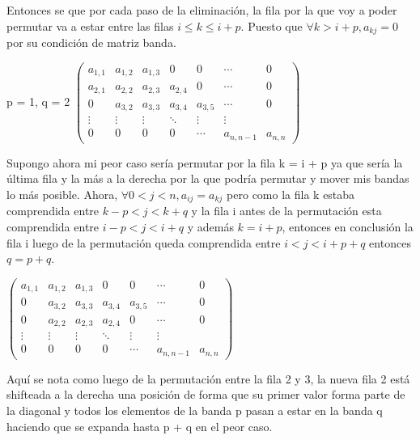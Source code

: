 Entonces se que por cada paso de la eliminaci\'on, la fila por la que voy a poder permutar va a estar entre las filas $i \leq k \leq i + p$. 
Puesto que $\forall k > i + p, a_{kj} = 0$ por su condici\'on de matriz banda.\newline
\newline
\begin{center}
p = 1, q = 2
$\begin{pmatrix}
a_{1,1} & a_{1,2} & a_{1,3} & 0 & 0 & \cdots & 0 \\
a_{2,1} & a_{2,2} & a_{2,3} & a_{2,4}& 0 & \cdots & 0 \\
0 & a_{3,2} & a_{3,3} & a_{3,4} & a_{3,5}& \cdots & 0 \\
\vdots  & \vdots & \vdots  & \ddots & \vdots & \vdots \\
0 & 0 & 0 & 0 & \cdots & a_{n, n-1} & a_{n,n}
\end{pmatrix}$ 
\end{center}
\newpage
Supongo ahora mi peor caso ser\'ia permutar por la fila k = i + p ya que ser\'ia la \'ultima fila y la m\'as a la derecha por la que podr\'ia permutar 
y mover mis bandas lo m\'as posible. Ahora, $\forall 0 < j < n, a_{ij} = a_{kj}$ pero como la fila k estaba comprendida entre $k-p < j < k + q$ y la 
fila i antes de la permutaci\'on esta comprendida entre $i-p < j < i + q$ y adem\'as $k = i + p$, entonces en conclusi\'on la fila i luego de la 
permutaci\'on queda comprendida entre $i < j < i + p + q$ entonces $q = p+q$.
\newline
\begin{center}
$\begin{pmatrix}
a_{1,1} & a_{1,2} & a_{1,3} & 0 & 0 & \cdots & 0 \\
0 & a_{3,2} & a_{3,3} & a_{3,4} & a_{3,5}& \cdots & 0 \\
0 & a_{2,2} & a_{2,3} & a_{2,4}& 0 & \cdots & 0 \\
\vdots  & \vdots & \vdots  & \ddots & \vdots & \vdots \\
0 & 0 & 0 & 0 & \cdots & a_{n, n-1} & a_{n,n}
\end{pmatrix}$
\end{center}

Aqu\'i se nota como luego de la permutaci\'on entre la fila 2 y 3, la nueva fila 2 est\'a shifteada a la derecha una
posici\'on de forma que su primer valor forma parte de la diagonal y todos los elementos de la banda p pasan a estar en la banda q haciendo que se expanda 
hasta p + q en el peor caso.


